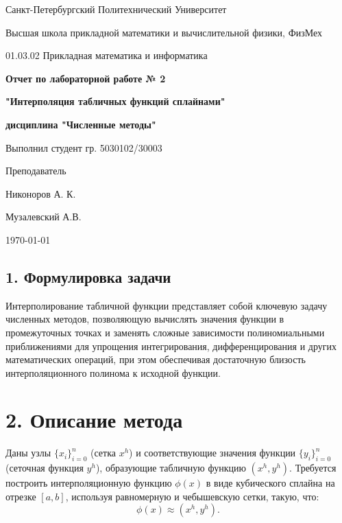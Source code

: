 \documentclass[12pt]{article}
\begin{document}
\thispagestyle{empty}
\begin{center}
\large
Санкт-Петербургский Политехнический Университет 
    
Высшая школа прикладной математики и вычислительной физики, ФизМех

01.03.02 Прикладная математика и информатика

\end{center}

\vspace{4cm}

\begin{center}
\Large

\textbf{Отчет по лабораторной работе № 2}

\textbf{"Интерполяция табличных функций сплайнами"}

\textbf{дисциплина "Численные методы"}

\end{center}

\vspace{11cm}
\noindent%
\begin{minipage}[t]{.75\textwidth}
\Large
Выполнил студент гр. 5030102/30003

Преподаватель
\end{minipage}%
\begin{minipage}[t]{.5\textwidth}
\Large
 Никоноров А. К.

 Музалевский А.В.
\end{minipage}%
\vspace{3cm}

\begin{center}
\large
\today
\end{center}
\newpage
        
\newpage


\subsection*{1. Формулировка задачи}
Интерполирование табличной функции представляет собой ключевую задачу численных методов, позволяющую вычислять значения функции в промежуточных точках и заменять сложные зависимости полиномиальными приближениями для упрощения интегрирования, дифференцирования и других математических операций, при этом обеспечивая достаточную близость интерполяционного полинома к исходной функции.

\section*{2. Описание метода}
Даны узлы \( \{x_i\}_{i=0}^n \) (сетка \( x^h \)) и соответствующие значения функции \( \{y_i\}_{i=0}^n \) (сеточная функция \( y^h \)), образующие табличную функцию \( (x^h, y^h) \). Требуется построить интерполяционную функцию \( \phi(x) \) в виде кубического сплайна на отрезке \([a, b]\), используя равномерную и чебышевскую сетки, такую, что:
\[
\phi(x) \approx (x^h, y^h).
\]
\end{document}
